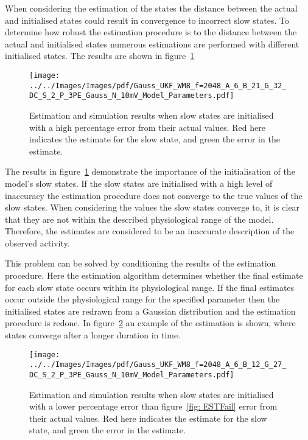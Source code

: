 When considering the estimation of the states the distance between the actual and initialised states could result in convergence to incorrect slow states. To determine how robust the estimation procedure is to the distance between the actual and initialised states numerous estimations are performed with different initialised states. The results are shown in figure~\ref{fig: EstInitFail}
\begin{figure}%
	\centering
		\texttt{[image: ../../Images/Images/pdf/Gauss\_UKF\_WM8\_f=2048\_A\_6\_B\_21\_G\_32\_DC\_S\_2\_P\_3PE\_Gauss\_N\_10mV\_Model\_Parameters.pdf]}
	\caption{Estimation and simulation results when slow states are initialised with a high percentage error from their actual values. Red here indicates the estimate for the slow state, and green the error in the estimate. }
	\label{fig: EstInitFail}
\end{figure}%

The results in figure~\ref{fig: EstInitFail} demonstrate the importance of the initialisation of the model's slow states. If the slow states are initialised with a high level of inaccuracy the estimation procedure does not converge to the true values of the slow states. When considering the values the slow states converge to, it is clear that they are not within the described physiological range of the model. Therefore, the estimates are considered to be an inaccurate description of the observed activity.

This problem can be solved by conditioning the results of the estimation procedure. Here the estimation algorithm determines whether the final estimate for each slow state occurs within its physiological range. If the final estimates occur outside the physiological range for the specified parameter then the initialised states are redrawn from a Gaussian distribution and the estimation procedure is redone. In figure~\ref{fig: EstInitPass} an example of the estimation is shown, where states converge after a longer duration in time.
\begin{figure}%
	\centering
		\texttt{[image: ../../Images/Images/pdf/Gauss\_UKF\_WM8\_f=2048\_A\_6\_B\_12\_G\_27\_DC\_S\_2\_P\_3PE\_Gauss\_N\_10mV\_Model\_Parameters.pdf]}
	\caption{Estimation and simulation results when slow states are initialised with a lower percentage error than figure~\ref{fig: ESTFail} error from their actual values. Red here indicates the estimate for the slow state, and green the error in the estimate.}
	\label{fig: EstInitPass}
\end{figure}%

